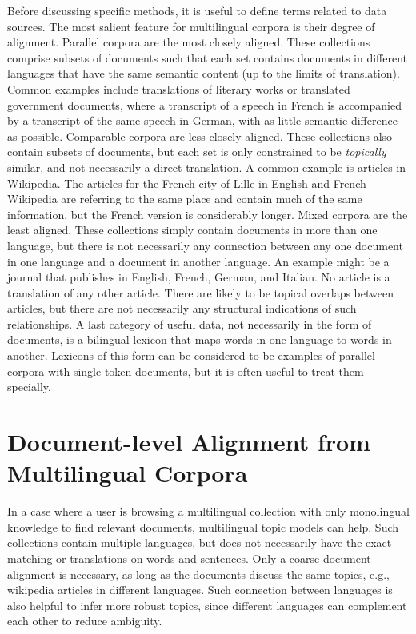 Before discussing specific methods, it is useful to define terms related to data sources.
The most salient feature for multilingual corpora is their degree of alignment.
Parallel corpora are the most closely aligned. These collections comprise subsets of documents such that each set contains documents in different languages that have the same semantic content (up to the limits of translation).
Common examples include translations of literary works or translated government documents, where a transcript of a speech in French is accompanied by a transcript of the  same speech in German, with as little semantic difference as possible.
Comparable corpora are less closely aligned. 
These collections also contain subsets of documents, but each set is only constrained to be {\em topically} similar, and not necessarily a direct translation.
A common example is articles in Wikipedia.
The articles for the French city of Lille in English and French Wikipedia are referring to the same place and contain much of the same information, but the French version is considerably longer.
Mixed corpora are the least aligned. These collections simply contain documents in more than one language, but there is not necessarily any connection between any one document in one language and a document in another language.
An example might be a journal that publishes in English, French, German, and Italian.
No article is a translation of any other article.
There are likely to be topical overlaps between articles, but there are not necessarily any structural indications of such relationships.
A last category of useful data, not necessarily in the form of documents, is a bilingual lexicon that maps words in one language to words in another.
Lexicons of this form can be considered to be examples of parallel corpora with single-token documents, but it is often useful to treat them specially.

\section{Document-level Alignment from Multilingual Corpora}
\label{sec:doc-align}

In a case where a user is browsing a multilingual collection with only monolingual knowledge
to find relevant documents, multilingual topic models can help. Such collections contain
multiple languages, but does not necessarily have the exact matching or translations 
on words and sentences. Only a coarse document alignment is necessary, as long as the documents
discuss the same topics, e.g., wikipedia articles in different
languages. Such connection between languages is also helpful to infer
more robust topics, since different languages can complement each
other to reduce ambiguity.

